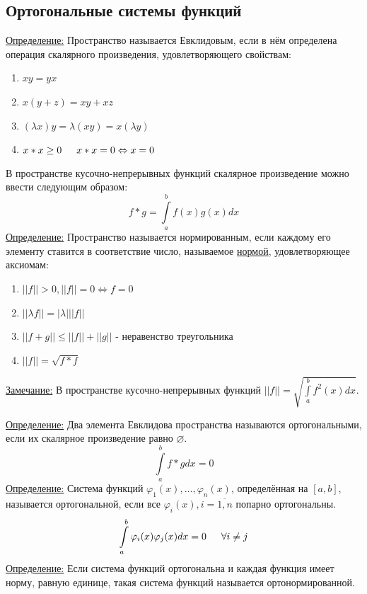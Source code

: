 \documentclass[12pt]{article}
\let\oldint\int
\renewcommand{\int}{\oldint\limits}
\begin{document}
    \subsection{Ортогональные системы функций}
    \underline{Определение:} Пространство называется Евклидовым, если в нём определена операция скалярного произведения, удовлетворяющего свойствам:
    \begin{enumerate}
      \item $xy = yx$
      \item $x(y+z) = xy + xz$
      \item $(\lambda x)y = \lambda (xy) = x (\lambda y)$
      \item $x * x \geq 0 \indent x * x = 0 \Leftrightarrow x = 0$
    \end{enumerate}
    В пространстве кусочно-непрерывных функций скалярное произведение можно ввести следующим образом:
    \[ f * g = \int_{a}^{b} f(x) g(x) dx \]
    \underline{Определение:} Пространство называется нормированным, если каждому его элементу ставится в соответствие число, называемое \underline{нормой}, удовлетворяющее аксиомам:
    \begin{enumerate}
      \item $||f|| > 0, ||f|| = 0 \Leftrightarrow f = 0$
      \item $|| \lambda f|| = |\lambda| ||f||$
      \item $||f + g|| \leq ||f|| + ||g||$ - неравенство треугольника
      \item $||f|| = \sqrt{f * f}$
    \end{enumerate}
    \underline{Замечание:} В пространстве кусочно-непрерывных функций $||f|| = \sqrt{\int_{a}^{b} f^2(x)dx}$.

    \pagebreak

    \underline{Определение:} Два элемента Евклидова пространства называются ортогональными, если их скалярное произведение равно $\varnothing$.
    \[ \int_{a}^{b} f * g dx = 0 \]
    \underline{Определение:} Система функций $\varphi_1(x), \dots, \varphi_n(x)$, определённая на $[a, b]$, называется ортогональной, если все $\varphi_i(x), i = \overline{1,n}$ попарно ортогональны.
    \[ \int_{a}^{b} \varphi_i(x) \varphi_j(x) dx = 0 \indent \forall i \neq j \]
    \underline{Определение:} Если система функций ортогональна и каждая функция имеет норму, равную единице, такая система функций называется ортонормированной.
  
\end{document}
